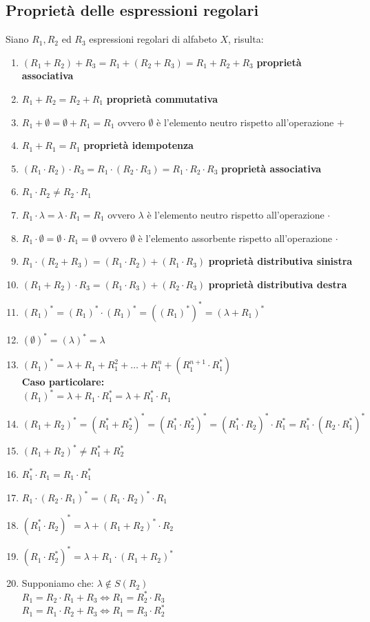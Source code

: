 \documentclass[12pt]{report}
\begin{document}
	\subsection{Proprietà delle espressioni regolari}
	Siano $R_1, R_2$ ed $R_3$ espressioni regolari di alfabeto $X$, risulta:
	\begin{enumerate}
		\item $(R_1 + R_2) + R_3 = R_1 + (R_2 + R_3) = R_1 + R_2 + R_3$ \textbf{proprietà associativa}
		\item $R_1 + R_2 = R_2 + R_1$ \textbf{proprietà commutativa}
		\item $R_1 + \emptyset = \emptyset + R_1 = R_1$ ovvero $\emptyset$ è l'elemento neutro rispetto all'operazione $+$
		\item $R_1 + R_1 = R_1$ \textbf{proprietà idempotenza}
		\item $(R_1 \cdot R_2) \cdot R_3 = R_1 \cdot (R_2 \cdot R_3) = R_1 \cdot R_2 \cdot R_3$ \textbf{proprietà associativa}
		\item $R_1 \cdot R_2 \neq R_2 \cdot R_1$
		\item $R_1 \cdot \lambda = \lambda \cdot R_1 = R_1$ ovvero $\lambda$ è l'elemento neutro rispetto all'operazione $\cdot$
		\item $R_1 \cdot \emptyset = \emptyset \cdot R_1 = \emptyset$ ovvero $\emptyset$ è l'elemento assorbente rispetto all'operazione $\cdot$
		\item $R_1 \cdot (R_2 + R_3) = (R_1 \cdot R_2) + (R_1 \cdot R_3)$ \textbf{proprietà distributiva sinistra}
		\item $(R_1 + R_2) \cdot R_3 = (R_1 \cdot R_3) + (R_2 \cdot R_3)$ \textbf{proprietà distributiva destra}
		\item $(R_1)^* = (R_1)^* \cdot (R_1)^* = ((R_1)^*)^* = (\lambda + R_1)^*$
		\item $(\emptyset)^* = (\lambda)^* = \lambda$
		\item $(R_1)^* = \lambda + R_1 + R_1^2 + \dots + R_1^n + (R_1^{n+ 1} \cdot R_1^*)$ \\
		\textbf{Caso particolare:} \\
		$(R_1)^* = \lambda + R_1 \cdot R_1^* = \lambda + R_1^* \cdot R_1$
		\item $(R_1 + R_2)^* = (R_1^* + R_2^*)^* = (R_1^* \cdot R_2^*)^* = (R_1^* \cdot R_2)^* \cdot R_1^* = R_1^* \cdot (R_2 \cdot R_1^*)^*$
		\item $(R_1 + R_2)^* \neq R_1^* + R_2^*$
		\item $R_1^* \cdot R_1 = R_1 \cdot R_1^*$
		\item $R_1 \cdot (R_2 \cdot R_1)^* = (R_1 \cdot R_2)^* \cdot R_1$
		\item $(R_1^* \cdot R_2)^* = \lambda + (R_1 + R_2)^* \cdot R_2$
		\item $(R_1 \cdot R_2^*)^* = \lambda + R_1 \cdot (R_1 + R_2)^*$
		\item Supponiamo che: $\lambda \notin S(R_2)$ \\
		$R_1 = R_2 \cdot R_1 + R_3 \iff R_1 = R_2^* \cdot R_3$ \\
		$R_1 = R_1 \cdot R_2 + R_3 \iff R_1 = R_3 \cdot R_2^*$
	\end{enumerate}
\end{document}
